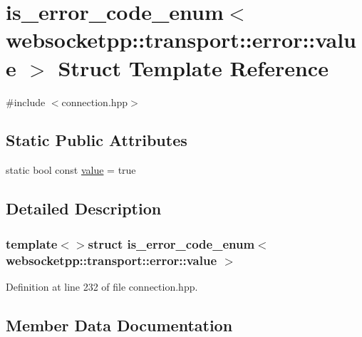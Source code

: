 \hypertarget{structis__error__code__enum_3_01websocketpp_1_1transport_1_1error_1_1value_01_4}{}\section{is\+\_\+error\+\_\+code\+\_\+enum$<$ websocketpp\+:\+:transport\+:\+:error\+:\+:value $>$ Struct Template Reference}
\label{structis__error__code__enum_3_01websocketpp_1_1transport_1_1error_1_1value_01_4}


{\ttfamily \#include $<$connection.\+hpp$>$}

\subsection*{Static Public Attributes}
\begin{DoxyCompactItemize}
\item 
static bool const \hyperlink{structis__error__code__enum_3_01websocketpp_1_1transport_1_1error_1_1value_01_4_a75058d7048e16ee883f1b54b4e5bcbbf}{value} = true
\end{DoxyCompactItemize}


\subsection{Detailed Description}
\subsubsection*{template$<$$>$struct is\+\_\+error\+\_\+code\+\_\+enum$<$ websocketpp\+::transport\+::error\+::value $>$}



Definition at line 232 of file connection.\+hpp.



\subsection{Member Data Documentation}
\hypertarget{structis__error__code__enum_3_01websocketpp_1_1transport_1_1error_1_1value_01_4_a75058d7048e16ee883f1b54b4e5bcbbf}{}
